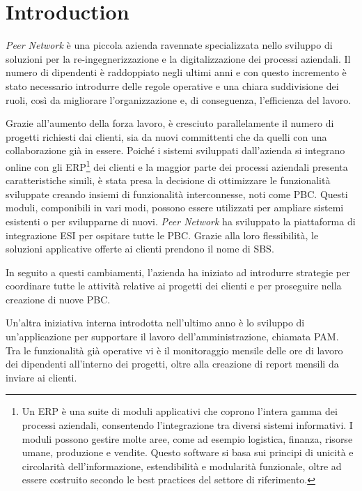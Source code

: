 \chapter{Introduction}
\label{chap:introduction}
\textit{Peer Network} è una piccola azienda ravennate specializzata nello sviluppo di soluzioni per 
la re-ingegnerizzazione e la digitalizzazione dei processi aziendali. Il numero di dipendenti 
è raddoppiato negli ultimi anni e con questo incremento è stato necessario introdurre delle 
regole operative e una chiara suddivisione dei ruoli, così da migliorare l'organizzazione e,
di conseguenza, l'efficienza del lavoro.

Grazie all'aumento della forza lavoro, è cresciuto parallelamente il numero di progetti 
richiesti dai clienti, sia da nuovi committenti che da quelli con una collaborazione già in 
essere. Poiché i sistemi sviluppati dall’azienda si integrano online con gli \ac{ERP}\footnote{Un 
\ac{ERP} è una suite di moduli applicativi che coprono l'intera gamma dei processi aziendali, 
consentendo l'integrazione tra diversi sistemi informativi. I moduli possono gestire molte aree, 
come ad esempio logistica, finanza, risorse umane, produzione e vendite. Questo software si 
basa sui principi di unicità e circolarità dell'informazione, estendibilità e modularità 
funzionale, oltre ad essere costruito secondo le best practices del settore di riferimento.}
dei clienti e la maggior parte dei processi aziendali presenta caratteristiche simili, 
è stata presa la decisione di ottimizzare le funzionalità sviluppate creando insiemi di 
funzionalità interconnesse, noti come \ac{PBC}. Questi moduli, 
componibili in vari modi, possono essere utilizzati per ampliare sistemi esistenti o per 
svilupparne di nuovi. \textit{Peer Network} ha sviluppato la piattaforma di integrazione \ac{ESI}
per ospitare tutte le \ac{PBC}. Grazie alla loro flessibilità, le soluzioni applicative offerte 
ai clienti prendono il nome di \ac{SBS}.

In seguito a questi cambiamenti, l’azienda ha iniziato ad introdurre strategie per coordinare 
tutte le attività relative ai progetti dei clienti e per proseguire nella creazione di nuove \ac{PBC}.

Un'altra iniziativa interna introdotta nell'ultimo anno è lo sviluppo di un'applicazione per 
supportare il lavoro dell'amministrazione, chiamata \ac{PAM}. Tra le funzionalità già operative 
vi è il monitoraggio mensile delle ore di lavoro dei dipendenti all'interno dei progetti, oltre 
alla creazione di report mensili da inviare ai clienti.

